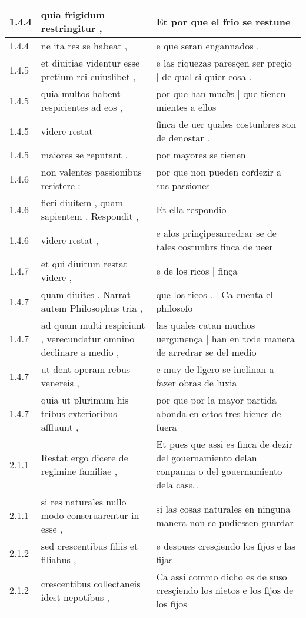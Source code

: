 \begin{tabular}{|p{1cm}|p{6.5cm}|p{6.5cm}|}
1.4.4 & quia frigidum restringitur , & Et por que el frio se restune \\\hline
1.4.4 & ne ita res se habeat , & e que seran engannados . \\\hline
1.4.5 & et diuitiae videntur esse pretium rei cuiuslibet , & e las riquezas paresçen ser preçio | de qual si quier cosa . \\\hline
1.4.5 & quia multos habent respicientes ad eos , & por que han muchͣs | que tienen mientes a ellos \\\hline
1.4.5 & videre restat & finca de uer quales costunbres son de denostar . \\\hline
1.4.5 & maiores se reputant , & por mayores se tienen \\\hline
1.4.6 & non valentes passionibus resistere : & por que non pueden corͣdezir a sus passiones \\\hline
1.4.6 & fieri diuitem , quam sapientem . Respondit , & Et ella respondio \\\hline
1.4.6 & videre restat , & e alos prinçipesarredrar se de tales costunbrs finca de ueer \\\hline
1.4.7 & et qui diuitum restat videre , & e de los ricos | finça \\\hline
1.4.7 & quam diuites . Narrat autem Philosophus tria , & que los ricos . | Ca cuenta el philosofo \\\hline
1.4.7 & ad quam multi respiciunt , verecundatur omnino declinare a medio , & las quales catan muchos uergunença | han en toda manera de arredrar se del medio \\\hline
1.4.7 & ut dent operam rebus venereis , & e muy de ligero se inclinan a fazer obras de luxia \\\hline
1.4.7 & quia ut plurimum his tribus exterioribus affluunt , & por que por la mayor partida abonda en estos tres bienes de fuera \\\hline
2.1.1 & Restat ergo dicere de regimine familiae , & Et pues que assi es finca de dezir del gouernamiento delan conpanna o del gouernamiento dela casa . \\\hline
2.1.1 & si res naturales nullo modo conseruarentur in esse , & si las cosas naturales en ninguna manera non se pudiessen guardar \\\hline
2.1.2 & sed crescentibus filiis et filiabus , & e despues cresçiendo los fijos e las fijas \\\hline
2.1.2 & crescentibus collectaneis idest nepotibus , & Ca assi commo dicho es de suso cresçiendo los nietos e los fijos de los fijos \\\hline

\end{tabular}
